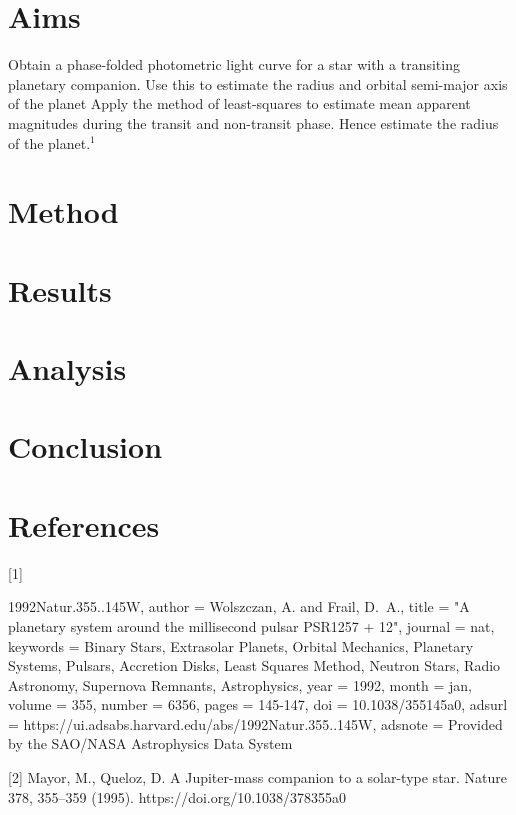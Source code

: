 \documentclass[]{article}
\begin{document}
\section*{Aims}

Obtain a phase-folded photometric light curve for a star with a transiting 
planetary companion. Use this to estimate the radius and orbital semi-major 
axis of the planet
Apply the method of least-squares to estimate mean apparent magnitudes 
during the transit and non-transit phase. Hence estimate the radius of the planet.$^1$


\section*{Method}

\section*{Results}

\section*{Analysis}


\section*{Conclusion}

\section*{References}

[1] {1992Natur.355..145W,
       author = {{Wolszczan}, A. and {Frail}, D.~A.},
        title = "{A planetary system around the millisecond pulsar PSR1257 + 12}",
      journal = {nat},
     keywords = {Binary Stars, Extrasolar Planets, Orbital Mechanics, Planetary Systems, Pulsars, Accretion Disks, Least Squares Method, Neutron Stars, Radio Astronomy, Supernova Remnants, Astrophysics},
         year = 1992,
        month = jan,
       volume = {355},
       number = {6356},
        pages = {145-147},
          doi = {10.1038/355145a0},
       adsurl = {https://ui.adsabs.harvard.edu/abs/1992Natur.355..145W},
      adsnote = {Provided by the SAO/NASA Astrophysics Data System}

      
}

[2] Mayor, M., Queloz, D. A Jupiter-mass companion to a solar-type star. Nature 378, 355–359 (1995). https://doi.org/10.1038/378355a0
\end{document}
